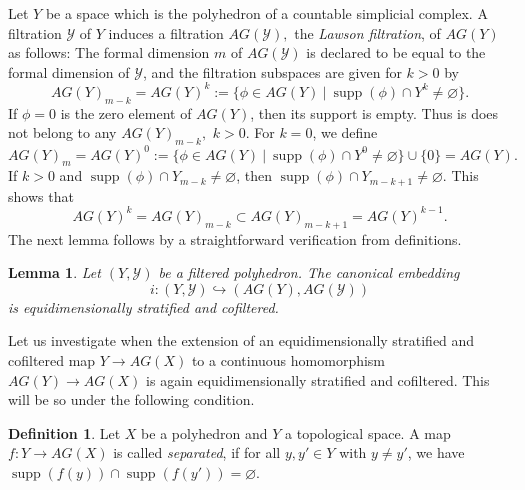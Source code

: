 \documentclass{amsart}
\newtheorem{lemma}[thm]{Lemma}
\theoremstyle{definition}
\newtheorem{defn}[thm]{Definition}
\theoremstyle{remark}
\newcommand {\Ya}    {\ensuremath{\mathcal{Y}}}
\newcommand {\supp}  {\ensuremath{\operatorname{supp}}}
\begin{document}
Let $Y$ be a space which is the polyhedron of a countable simplicial complex.
A filtration $\Ya$ of $Y$ induces a filtration $AG(\Ya),$ the 
\emph{Lawson filtration}, of
$AG (Y)$ as follows: The formal dimension $m$ of $AG(\Ya)$ is declared 
to be equal to the formal dimension of $\Ya$, and the filtration subspaces
are given for $k>0$ by
\[
AG(Y)_{m-k} = AG(Y)^k := \{ \phi \in AG(Y) ~|~
             \supp (\phi) \cap Y^k \not= \varnothing \}.
\]
If $\phi =0$ is the zero element of $AG(Y)$, then its support is
empty. Thus is does not belong to any $AG(Y)_{m-k},$ $k>0$.
For $k=0$, we define
\[
AG(Y)_m = AG(Y)^0 := \{ \phi \in AG(Y) ~|~
             \supp (\phi) \cap Y^0 \not= \varnothing \} \cup \{ 0 \}
         = AG(Y).
\]
If $k>0$ and
$\supp (\phi) \cap Y_{m-k} \not= \varnothing$, then
$\supp (\phi) \cap Y_{m-k+1} \not= \varnothing$. This shows that
\[ AG(Y)^k = AG(Y)_{m-k} \subset AG(Y)_{m-k+1} = AG(Y)^{k-1}. \]
The next lemma follows by a straightforward verification from definitions.
\begin{lemma} \label{lem.canonemyagyiseqdstratandcof}
Let $(Y,\Ya)$ be a filtered polyhedron.
The canonical embedding
\[ i:(Y,\Ya) \hookrightarrow (AG(Y), AG(\Ya)) \]
is equidimensionally stratified and cofiltered.
\end{lemma}

Let us investigate when the extension of an equidimensionally
stratified and cofiltered map $Y\to AG(X)$ to a continuous homomorphism
$AG(Y) \to AG (X)$ is again equidimensionally stratified and cofiltered.
This will be so under the following condition.
\begin{defn} \label{def.separatedmapintoag}
Let $X$ be a polyhedron and $Y$ a topological space.
A map $f:Y \to AG(X)$ is called \emph{separated},
if for all $y,y' \in Y$ with $y\not= y'$, we have
$\supp (f(y)) \cap \supp (f(y')) = \varnothing.$
\end{defn}
\end{document}
